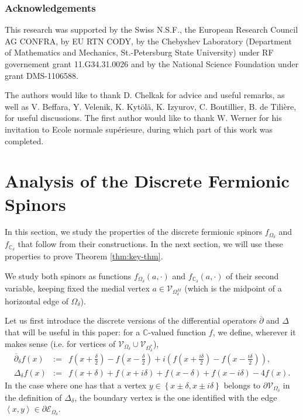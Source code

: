 \documentclass[oneside,english]{amsart}
\numberwithin{equation}{section}
\numberwithin{figure}{section}
\theoremstyle{plain}
\theoremstyle{plain}
\theoremstyle{plain}
\theoremstyle{plain}
\theoremstyle{plain}
\theoremstyle{definition}
\theoremstyle{remark}
\begin{document}
\subsubsection*{Acknowledgements}

This research was supported by the Swiss N.S.F., the European Research
Council AG CONFRA, by EU RTN CODY, by the Chebyshev Laboratory (Department
of Mathematics and Mechanics, St.-Petersburg State University) under
RF governement grant 11.G34.31.0026 and by the National Science Foundation
under grant DMS-1106588. 

The authors would like to thank D. Chelkak for advice and useful remarks,
as well as V. Beffara, Y. Velenik, K. Kytölä, K. Izyurov, C. Boutillier,
B. de Tilière, for useful discussions. The first author would like
to thank W. Werner for his invitation to Ecole normale supérieure,
during which part of this work was completed.


\section{Analysis of the Discrete Fermionic Spinors}

In this section, we study the properties of the discrete fermionic
spinors $f_{\Omega_{\delta}}$ and $f_{\mathbb{C}_{\delta}}$ that
follow from their constructions. In the next section, we will use
these properties to prove Theorem \ref{thm:key-thm}. 

We study both spinors as functions $f_{\Omega_{\delta}}\left(a,\cdot\right)$
and $f_{\mathbb{C}_{\delta}}\left(a,\cdot\right)$ of their second
variable, keeping fixed the medial vertex $a\in\mathcal{V}_{\Omega_{\delta}^{M}}$
(which is the midpoint of a horizontal edge of $\Omega_{\delta}$). 

Let us first introduce the discrete versions of the differential operators
$\overline{\partial}$ and $\Delta$ that will be useful in this paper:
for a $\mathbb{C}$-valued function $f$, we define, wherever it makes
sense (i.e. for vertices of $\mathcal{V}_{\Omega_{\delta}}\cup\mathcal{V}_{\Omega_{\delta}^{*}}$),
\begin{eqnarray*}
\overline{\partial}_{\delta}f\left(x\right) & := & f\left(x+\frac{\delta}{2}\right)-f\left(x-\frac{\delta}{2}\right)+i\left(f\left(x+\frac{i\delta}{2}\right)-f\left(x-\frac{i\delta}{2}\right)\right),\\
\Delta_{\delta}f\left(x\right) & := & f\left(x+\delta\right)+f\left(x+i\delta\right)+f\left(x-\delta\right)+f\left(x-i\delta\right)-4f\left(x\right).
\end{eqnarray*}
In the case where one has that a vertex $y\in\left\{ x\pm\delta,x\pm i\delta\right\} $
belongs to $\partial\mathcal{V}_{\Omega_{\delta}}$ in the definition
of $\Delta_{\delta}$, the boundary vertex is the one identified with
the edge $\left\langle x,y\right\rangle \in\partial\mathcal{E}_{\Omega_{\delta}}$. 
\end{document}
